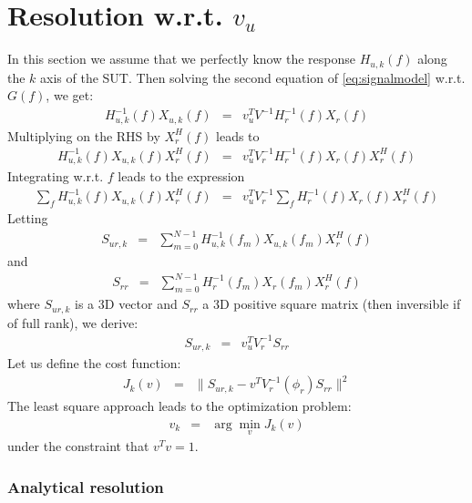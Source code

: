 \documentclass[a4paper, 12pt]{report}
\begin{document}
\section{Resolution w.r.t. $v_{u}$}
In this section we assume that we perfectly know the response $H_{u,k}(f)$ along the $k$ axis of the SUT. Then solving the second equation of \eqref{eq:signalmodel} w.r.t. $G(f)$, we get:
\begin{eqnarray}
\label{eq:XuasXr}
H_{u,k}^{-1}(f)X_{u,k}(f)&=&v_{u}^{T}V ^{-1}H_{r}^{-1}(f)X_{r}(f)
\end{eqnarray}
Multiplying on the RHS by $X_{r}^{H}(f)$ leads to
\begin{eqnarray*}
H_{u,k}^{-1}(f)X_{u,k}(f)X_{r}^{H}(f)&=&v_{u}^{T}V _{r}^{-1}H_{r}^{-1}(f)X_{r}(f)X_{r}^{H}(f)
\end{eqnarray*}
Integrating w.r.t. $f$ leads to the expression
\begin{eqnarray}
\label{eq:integrateonf}
\sum_{f} H_{u,k}^{-1}(f)X_{u,k}(f)X_{r}^{H}(f)&=&
v_{u}^{T}V_{r}^{-1}
\sum_{f} H_{r}^{-1}(f)X_{r}(f)X_{r}^{H}(f)
\end{eqnarray}
Letting
\begin{eqnarray*}
S_{ur,k}&=&\sum_{m=0}^{N-1} H_{u,k}^{-1}(f_{m})X_{u,k}(f_{m})X_{r}^{H}(f)
\end{eqnarray*}
and 
\begin{eqnarray*}
S_{rr}&=&\sum_{m=0}^{N-1} H_{r}^{-1}(f_{m})X_{r}(f_{m})X_{r}^{H}(f)
\end{eqnarray*}
where $S_{ur,k}$ is a 3D vector and $S_{rr}$ a $3$D positive square matrix (then inversible if of full rank), 
we derive:
\begin{eqnarray}
\label{eq:linearmodel}
S_{ur,k}&=&v_{u}^{T}V_{r}^{-1}S_{rr}
\end{eqnarray}
Let us define the cost function:
\begin{eqnarray}
\label{eq:pbtosolve}
J_{k}(v) &=&  \|S_{ur,k} - v^{T}V_{r}^{-1}(\phi_{r})S_{rr}\|^{2}
\end{eqnarray}
The least square approach leads to the optimization problem:
\begin{eqnarray}
 \label{eq:hatphi}
v_{k} &=& \arg\min_{v} J_{k}(v)
\end{eqnarray}
under the constraint that $v^{T}v=1$.

 
\subsubsection{Analytical resolution}
\end{document}
